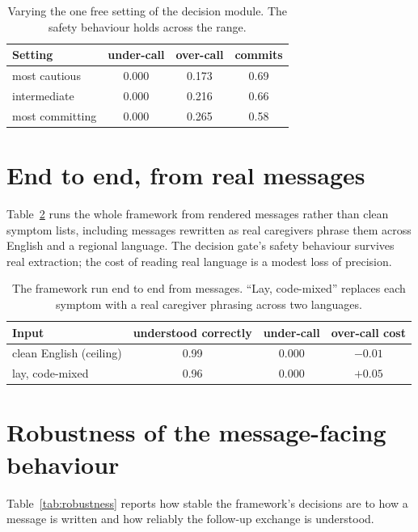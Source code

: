 \documentclass[11pt]{article}
\begin{document}
\begin{table}[h]
\centering
\caption{Varying the one free setting of the decision module. The safety behaviour holds across the range.}
\label{tab:alpha}
\small
\begin{tabular}{lccc}
\toprule
Setting & under-call & over-call & commits \\
\midrule
most cautious & 0.000 & 0.173 & 0.69 \\
intermediate & 0.000 & 0.216 & 0.66 \\
most committing & 0.000 & 0.265 & 0.58 \\
\bottomrule
\end{tabular}
\end{table}

\section{End to end, from real messages}
\label{app:endtoend}
Table~\ref{tab:endtoend} runs the whole framework from rendered messages rather than clean symptom lists,
including messages rewritten as real caregivers phrase them across English and a regional language. The
decision gate's safety behaviour survives real extraction; the cost of reading real language is a modest loss
of precision.

\begin{table}[h]
\centering
\caption{The framework run end to end from messages. ``Lay, code-mixed'' replaces each symptom with a real
caregiver phrasing across two languages.}
\label{tab:endtoend}
\small
\begin{tabular}{lccc}
\toprule
Input & understood correctly & under-call & over-call cost \\
\midrule
clean English (ceiling) & 0.99 & 0.000 & $-0.01$ \\
lay, code-mixed & 0.96 & 0.000 & $+0.05$ \\
\bottomrule
\end{tabular}
\end{table}

\section{Robustness of the message-facing behaviour}
\label{app:robustness}
Table~\ref{tab:robustness} reports how stable the framework's decisions are to how a message is written and
how reliably the follow-up exchange is understood.
\end{document}
